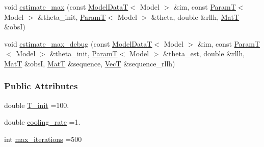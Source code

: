 \begin{DoxyCompactItemize}
\item 
void \hyperlink{classmappel_1_1Estimator_a8f85cf26c72c34d0071ccd2f8bb56abd}{estimate\+\_\+max} (const \hyperlink{namespacemappel_a97f050df953605381ae9c901c3b125f1}{Model\+DataT}$<$ Model $>$ \&im, const \hyperlink{namespacemappel_a667925cb0d6c0e49f2f035cc5a9a6857}{ParamT}$<$ Model $>$ \&theta\+\_\+init, \hyperlink{namespacemappel_a667925cb0d6c0e49f2f035cc5a9a6857}{ParamT}$<$ Model $>$ \&theta, double \&rllh, \hyperlink{namespacemappel_a7091ab87c528041f7e2027195fad8915}{MatT} \&obsI)
\item 
void \hyperlink{classmappel_1_1Estimator_a4a581372a320f1c13eeffacf6309911b}{estimate\+\_\+max\+\_\+debug} (const \hyperlink{namespacemappel_a97f050df953605381ae9c901c3b125f1}{Model\+DataT}$<$ Model $>$ \&im, const \hyperlink{namespacemappel_a667925cb0d6c0e49f2f035cc5a9a6857}{ParamT}$<$ Model $>$ \&theta\+\_\+init, \hyperlink{namespacemappel_a667925cb0d6c0e49f2f035cc5a9a6857}{ParamT}$<$ Model $>$ \&theta\+\_\+est, double \&rllh, \hyperlink{namespacemappel_a7091ab87c528041f7e2027195fad8915}{MatT} \&obsI, \hyperlink{namespacemappel_a7091ab87c528041f7e2027195fad8915}{MatT} \&sequence, \hyperlink{namespacemappel_a2225ad69f358daa3f4f99282a35b9a3a}{VecT} \&sequence\+\_\+rllh)
\end{DoxyCompactItemize}
\subsubsection*{Public Attributes}
\begin{DoxyCompactItemize}
\item 
double \hyperlink{classmappel_1_1SimulatedAnnealingMaximizer_a5a697acb3663ef6aad85157cce00080e}{T\+\_\+init} =100.
\item 
double \hyperlink{classmappel_1_1SimulatedAnnealingMaximizer_af67fa796254c7b027de1a44b5d33afcb}{cooling\+\_\+rate} =1.
\item 
int \hyperlink{classmappel_1_1SimulatedAnnealingMaximizer_a0b6619e3ed668b51e477037955615f92}{max\+\_\+iterations} =500
\end{DoxyCompactItemize}

